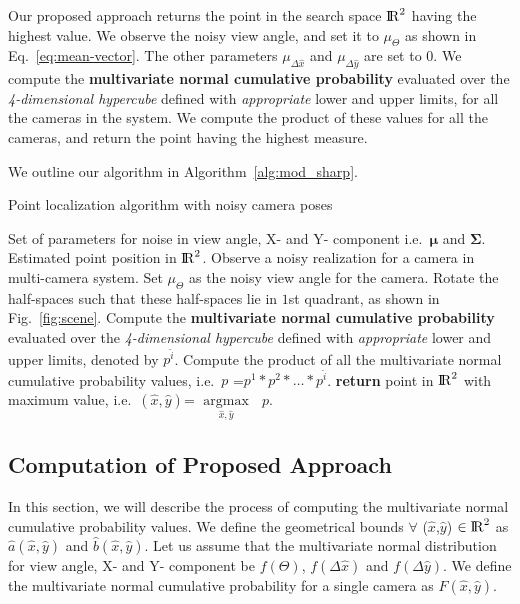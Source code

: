 Our proposed approach returns the point in the search space ${\rm I\!R}^{2}$ having the highest value. We observe the noisy view angle, and set it to $\mu_\Theta$ as shown in Eq.~\ref{eq:mean-vector}. The other parameters $\mu_{\Delta \hat{x}}$ and $\mu_{\Delta \hat{y}}$ are set to $0$. We compute the \textbf{multivariate normal cumulative probability} evaluated over the \emph{4-dimensional hypercube} defined with \emph{appropriate} lower and upper limits, for all the cameras in the system. We compute the product of these values for all the cameras, and return the point having the highest measure.

We outline our algorithm in Algorithm~\ref{alg:mod_sharp}. 

\begin{algorithm}[htb]
\caption{Point localization algorithm with noisy camera poses}
\label{alg:mod_sharp} 
\begin{algorithmic}[1]
\Require Set of parameters for noise in view angle, X- and Y- component i.e.\ $\boldsymbol{\mu}$ and $\mathbf{\Sigma}$.
\Ensure Estimated point position in ${\rm I\!R}^{2}$.
	\State Observe a noisy realization for a camera in multi-camera system.
	\State Set $\mu_\Theta$ as the noisy view angle for the camera.
	\State Rotate the half-spaces such that these half-spaces lie in $1$st quadrant, as shown in Fig.~\ref{fig:scene}.
	\State Compute the \textbf{multivariate normal cumulative probability} evaluated over the \emph{4-dimensional hypercube} defined with \emph{appropriate} lower and upper limits, denoted by $p^{\hat{i}}$. 
\EndLoop
\EndLoop
\State Compute the product of all the multivariate normal cumulative probability values, i.e.\ $p$ =$p^1*p^2*\ldots*p^{\hat{i}}$.
\State \textbf{return} point in ${\rm I\!R}^{2}$ with maximum value, i.e.\ $(\hat{x},\hat{y})$= $\underset{\hat{x},\hat{y}}{\operatorname{argmax}}\mbox{ }p$.
	\end{algorithmic}
\end{algorithm}

\subsection{Computation of Proposed Approach}
In this section, we will describe the process of computing the multivariate normal cumulative probability values. We define the geometrical bounds $\forall$ ($\hat{x}$,$\hat{y}$) $\in {\rm I\!R}^{2}$ as $\hat{a}(\hat{x},\hat{y})$ and $\hat{b}(\hat{x},\hat{y})$. Let us assume that the multivariate normal distribution for view angle, X- and Y- component be $f(\Theta)$, $f(\Delta \hat{x})$ and $f(\Delta \hat{y})$. We define the multivariate normal cumulative probability for a single camera as $F(\hat{x},\hat{y})$.

